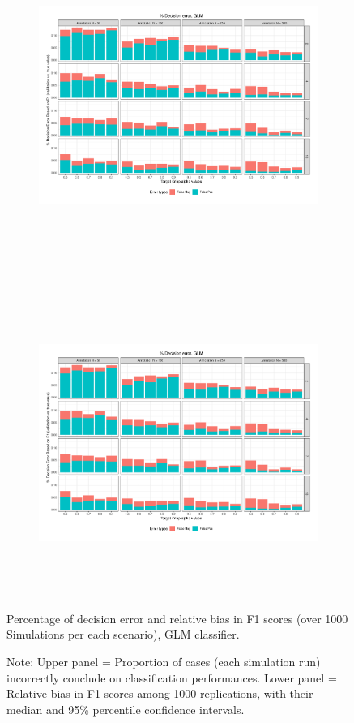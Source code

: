 \documentclass[man, floatsintext, 12pt, a4paper, noextraspace]{apa6}
\begin{document}
\begin{figure}[!htbp] 
    \centering
    \begin{subfigure}[t]{0.95\textwidth}
        \centering
        \includegraphics[clip, width=\linewidth, height=11cm, page = 1]{Results/GLM_summary_05.pdf} 
    \end{subfigure}
    \begin{subfigure}[t]{0.95\textwidth}
        \centering
        \includegraphics[clip, width=\linewidth, height=10cm, page = 2]{Results/GLM_summary_05.pdf} 
    \end{subfigure}
    
    \captionsetup{format=hang}
    \caption{Percentage of decision error and relative bias in F1 scores (over 1000 Simulations per each scenario), GLM classifier.} 
    \label{fig:Figure3}
    \captionsetup{font=small}
    \caption*{Note: Upper panel = Proportion of cases (each simulation run) incorrectly conclude on classification performances. Lower panel = Relative bias in F1 scores among 1000 replications, with their median and 95\% percentile confidence intervals.}
\end{figure}     
\end{document}
